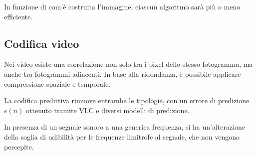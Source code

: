 In funzione di com'è costruita l'immagine, ciascun algoritmo sarà più o meno efficiente. 

\subsection{Codifica video}
Nei video esiste una correlazione non solo tra i pixel dello stesso fotogramma, ma anche tra fotogrammi adiacenti. In base alla ridondanza, è possibile applicare compressione spaziale e temporale.

La codifica predittiva rimuove entrambe le tipologie, con un errore di predizione $e(n)$ ottenuto tramite VLC e diversi modelli di predizione. %

In presenza di un segnale sonoro a una generica frequenza, si ha un'alterazione della soglia di udibilità per le frequenze limitrofe al segnale, che non vengono percepite. 



